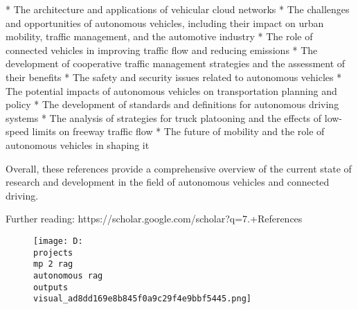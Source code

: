 \documentclass[12pt,a4paper]{article}
\begin{document}
* The architecture and applications of vehicular cloud networks
* The challenges and opportunities of autonomous vehicles, including their impact on urban mobility, traffic management, and the automotive industry
* The role of connected vehicles in improving traffic flow and reducing emissions
* The development of cooperative traffic management strategies and the assessment of their benefits
* The safety and security issues related to autonomous vehicles
* The potential impacts of autonomous vehicles on transportation planning and policy
* The development of standards and definitions for autonomous driving systems
* The analysis of strategies for truck platooning and the effects of low-speed limits on freeway traffic flow
* The future of mobility and the role of autonomous vehicles in shaping it

Overall, these references provide a comprehensive overview of the current state of research and development in the field of autonomous vehicles and connected driving.

Further reading: https://scholar.google.com/scholar?q=7.+References
\begin{figure}[h]
\centering
\texttt{[image: D:\\projects\\mp 2 rag\\autonomous rag\\outputs\\visual\_ad8dd169e8b845f0a9c29f4e9bbf5445.png]}
\end{figure}
\end{document}
